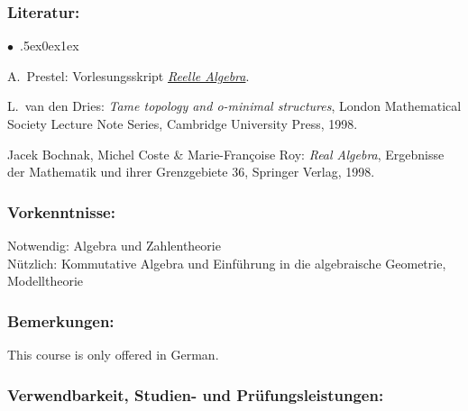 \documentclass[a4paper,10pt]{article}
\renewenvironment{itemize}{\begin{list}{$\bullet$\ }{\itemsep.5ex\setlength{\topsep}{0.5\itemsep}\parsep0ex\labelsep1ex\settowidth{\labelwidth}{$\bullet$\ }\setlength{\leftmargin}{\labelwidth}\addtolength{\leftmargin}{3ex}\addtolength{\leftmargin}{\labelsep}}}{\end{list}}
\begin{document}
\subsubsection*{\large
    Literatur:
}
\begin{itemize}
\item A.~Prestel: Vorlesungsskript \href{http://www.math.uni-konstanz.de/\~prestel/raskript.pdf}{\emph{Reelle Algebra}}.
\item
L.~van den Dries: \emph{Tame topology and o-minimal structures}, London Mathematical Society Lecture Note Series, Cambridge University Press, 1998. 
\item
Jacek Bochnak, Michel Coste \& Marie-Françoise Roy: \emph{Real Algebra}, Ergebnisse der Mathematik und ihrer Grenzgebiete 36, Springer Verlag, 1998.
\end{itemize}
\subsubsection*{\large
    Vorkenntnisse:
}
Notwendig: Algebra und Zahlentheorie \\
Nützlich: Kommutative Algebra und Einführung in die algebraische Geometrie, Modelltheorie
\subsubsection*{\large
    Bemerkungen:
}
This course is only offered in German.
\subsubsection*{\large
    Verwendbarkeit, Studien- und Prüfungsleistungen:
}
\end{document}
